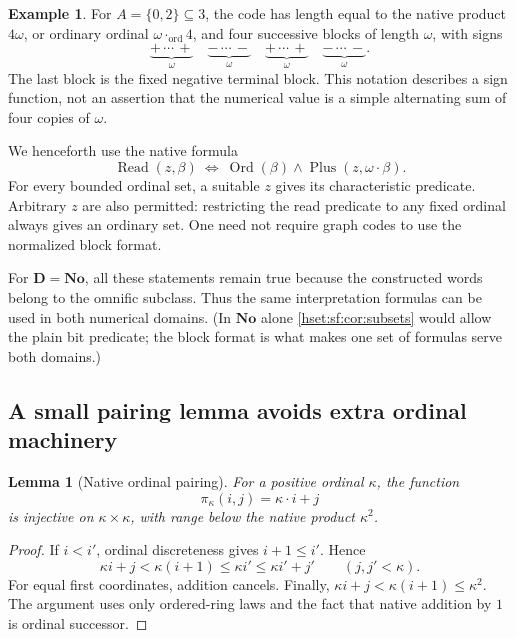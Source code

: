 \documentclass[11pt,letterpaper]{article}
\newtheorem{lemma}[lemma]{Lemma}\aliascntresetthe{lemma}
\theoremstyle{definition}
\newtheorem{example}[example]{Example}\aliascntresetthe{example}
\theoremstyle{remark}
\newcommand{\No}{\mathbf{No}}
\newcommand{\Ord}{\operatorname{Ord}}
\newcommand{\Plusp}{\operatorname{Plus}}
\newcommand{\Readp}{\operatorname{Read}}
\newcommand{\Dd}{\mathbf{D}}
\begin{document}
\begin{example}\label{hset:sf:ex:blocks}
For $A=\{0,2\}\subseteq3$, the code has length equal to the native product
$4\omega$, or ordinary ordinal $\omega\cdot_{\mathrm{ord}}4$, and four successive
blocks of length $\omega$, with signs
\[
 \underbrace{+\,\cdots\,+}_{\omega}\quad
 \underbrace{-\,\cdots\,-}_{\omega}\quad
 \underbrace{+\,\cdots\,+}_{\omega}\quad
 \underbrace{-\,\cdots\,-}_{\omega}.
\]
The last block is the fixed negative terminal block. This notation describes a
sign function, not an assertion that the numerical value is a simple alternating
sum of four copies of $\omega$.
\end{example}

We henceforth use the native formula
\begin{equation}\label{hset:sf:eq:read}
 \Readp(z,\beta)\ \Longleftrightarrow\ \Ord(\beta)\land\Plusp(z,\omega\cdot\beta).
\end{equation}
For every bounded ordinal set, a suitable $z$ gives its characteristic predicate.
Arbitrary $z$ are also permitted: restricting the read predicate to any fixed
ordinal always gives an ordinary set. One need not require graph codes to use the
normalized block format.

For $\Dd=\No$, all these statements remain true because the constructed words
belong to the omnific subclass. Thus the same interpretation formulas can be used
in both numerical domains. (In $\No$ alone \cref{hset:sf:cor:subsets} would allow
the plain bit predicate; the block format is what makes one set of formulas serve
both domains.)

\subsection{A small pairing lemma avoids extra ordinal machinery}

\begin{lemma}[Native ordinal pairing]\label{hset:sf:lem:pairing}
For a positive ordinal $\kappa$, the function
\[
 \pi_\kappa(i,j)=\kappa\cdot i+j
\]
is injective on $\kappa\times\kappa$, with range below the native product
$\kappa^2$.
\end{lemma}
\begin{proof}
If $i<i'$, ordinal discreteness gives $i+1\le i'$. Hence
\[
 \kappa i+j<\kappa(i+1)\le\kappa i'\le\kappa i'+j'\qquad(j,j'<\kappa).
\]
For equal first coordinates, addition cancels. Finally,
$\kappa i+j<\kappa(i+1)\le\kappa^2$. The argument uses only ordered-ring laws and
the fact that native addition by $1$ is ordinal successor.
\end{proof}
\end{document}
